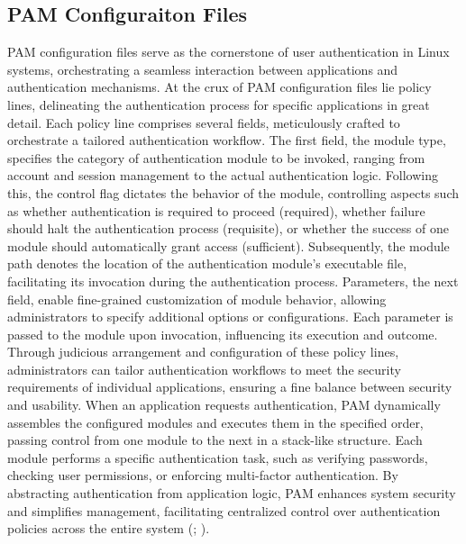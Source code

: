 \documentclass[
]{article}
\begin{document}
\begin{multicols}{2}

\section{PAM Configuraiton Files}
PAM configuration files serve as the cornerstone of user authentication in Linux systems, orchestrating a seamless interaction between applications and authentication mechanisms. At the crux of PAM configuration files lie policy lines, delineating the authentication process for specific applications in great detail. Each policy line comprises several fields, meticulously crafted to orchestrate a tailored authentication workflow. The first field, the module type, specifies the category of authentication module to be invoked, ranging from account and session management to the actual authentication logic. Following this, the control flag dictates the behavior of the module, controlling aspects such as whether authentication is required to proceed (required), whether failure should halt the authentication process (requisite), or whether the success of one module should automatically grant access (sufficient). Subsequently, the module path denotes the location of the authentication module's executable file, facilitating its invocation during the authentication process. Parameters, the next field, enable fine-grained customization of module behavior, allowing administrators to specify additional options or configurations. Each parameter is passed to the module upon invocation, influencing its execution and outcome. Through judicious arrangement and configuration of these policy lines, administrators can tailor authentication workflows to meet the security requirements of individual applications, ensuring a fine balance between security and usability. When an application requests authentication, PAM dynamically assembles the configured modules and executes them in the specified order, passing control from one module to the next in a stack-like structure. Each module performs a specific authentication task, such as verifying passwords, checking user permissions, or enforcing multi-factor authentication. By abstracting authentication from application logic, PAM enhances system security and simplifies management, facilitating centralized control over authentication policies across the entire system (\cite{stallings2020}; \cite{love2010}).

\end{multicols}
\end{document}
